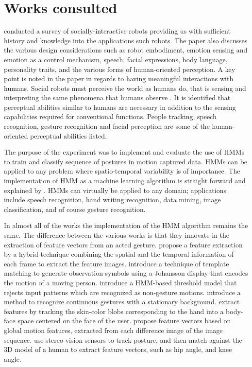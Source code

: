 \documentclass[]{report}   %
\begin{document}
\section{Works consulted}
\citet{Fong2003143} conducted a survey of socially-interactive robots providing us with sufficient history and knowledge into the applications such robots. The paper also discusses the various design considerations such as robot embodiment, emotion sensing and emotion as a control mechanism, speech, facial expressions, body language, personality traits, and the various forms of human-oriented perception. A key point is noted in the paper in regards to having meaningful interactions with humans. Social robots must perceive the world as humans do, that is sensing and interpreting the same phenomena that humans observe \cite{Fong2003143}. It is identified that perceptual abilities similar to humans are necessary in addition to the sensing capabilities required for conventional functions. People tracking, speech recognition, gesture recognition and facial perception are some of the human-oriented perceptual abilities listed.

The purpose of the experiment was to implement and evaluate the use of HMMs to train and classify sequence of postures in motion captured data. HMMs can be applied to any problem where spatio-temporal variability is of importance\cite{ 1165342}. The implementation of HMM as a machine learning algorithm is straight forward and explained by \citet{ 1165342}. HMMs can virtually be applied to any domain; applications include speech recognition\cite{54527}, hand writing recognition\cite{541414}, data mining\cite{5602641}, image classification\cite{4379516}, and of course gesture recognition\cite{4154947}. 

In almost all of the works the implementation of the HMM algorithm remains the same. The difference between the various works is that they innovate in the extraction of feature vectors from an acted gesture. \citet{Huang:2001:MHG:375397.375409} propose a feature extraction by a hybrid technique combining the spatial and the temporal information of each frame to extract the feature images. \citet{springerlink:10.1007/s00422-004-0516-0} introduce a technique of template matching to generate observation symbols using a Johansson display that encodes the motion of a moving person. \citet{799904} introduce a HMM-based threshold model that rejects input patterns which are recognized as non-gesture motions. \citet{Chen2003745} introduce a method to recognize continuous gestures with a stationary background. \citet{840674} extract features by tracking the skin-color blobs corresponding to the hand into a body-face space centered on the face of the user\cite{840674}. \citet{Rigoll98highperformance} propose feature vectors based on global motion features, extracted from each difference image of the image sequence. \citet{Pellegrini06humanposture} use stereo vision sensors to track posture, and then match against the 3D model of a human to extract feature vectors, such as hip angle, and knee angle. 
\end{document}
